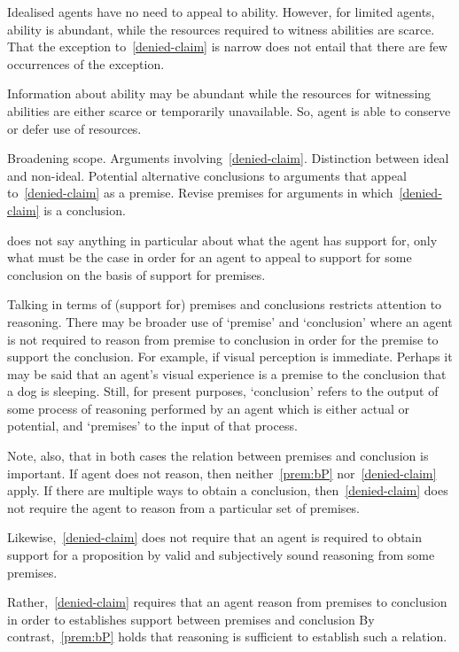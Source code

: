 \begin{note}
  Idealised agents have no need to appeal to ability.
  However, for limited agents, ability is abundant, while the resources required to witness abilities are scarce.
  That the exception to~\ref{denied-claim} is narrow does not entail that there are few occurrences of the exception.

  Information about ability may be abundant while the resources for witnessing abilities are either scarce or temporarily unavailable.
  So, agent is able to conserve or defer use of resources.

  Broadening scope.
  Arguments involving~\ref{denied-claim}.
  Distinction between ideal and non-ideal.
  Potential alternative conclusions to arguments that appeal to~\ref{denied-claim} as a premise.
  Revise premises for arguments in which~\ref{denied-claim} is a conclusion.
\end{note}

\begin{note}[Scope of \mp{}]
  \mp{} does not say anything in particular about what the agent has support for, only what must be the case in order for an agent to appeal to support for some conclusion on the basis of support for premises.

  Talking in terms of (support for) premises and conclusions restricts attention to reasoning.
  There may be broader use of `premise' and `conclusion' where an agent is not required to reason from premise to conclusion in order for the premise to support the conclusion.
  For example, if visual perception is immediate.
  Perhaps it may be said that an agent's visual experience is a premise to the conclusion that a dog is sleeping.
  Still, for present purposes, `conclusion' refers to the output of some process of reasoning performed by an agent which is either actual or potential, and `premises' to the input of that process.

  Note, also, that in both cases the relation between premises and conclusion is important.
  If agent does not reason, then neither~\ref{prem:bP} nor~\ref{denied-claim} apply.
  If there are multiple ways to obtain a conclusion, then~\ref{denied-claim} does not require the agent to reason from a particular set of premises.

  Likewise,~\ref{denied-claim} does not require that an agent is required to obtain support for a proposition by valid and subjectively sound reasoning from some premises.

  Rather,~\ref{denied-claim} requires that an agent reason from premises to conclusion in order to establishes support between premises and conclusion
  By contrast,~\ref{prem:bP} holds that reasoning is sufficient to establish such a relation.
\end{note}

